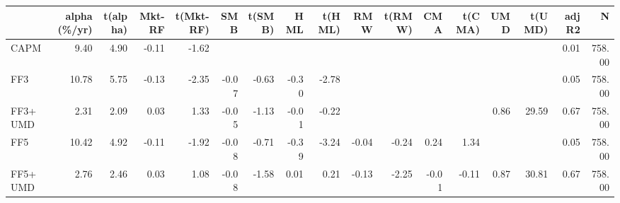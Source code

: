 \begin{tabular}{lrrrrrrrrrrrrrrrr}
\toprule
 & alpha (\%/yr) & t(alpha) & Mkt-RF & t(Mkt-RF) & SMB & t(SMB) & HML & t(HML) & RMW & t(RMW) & CMA & t(CMA) & UMD & t(UMD) & adj R2 & N \\
\midrule
CAPM & 9.40 & 4.90 & -0.11 & -1.62 &  &  &  &  &  &  &  &  &  &  & 0.01 & 758.00 \\
FF3 & 10.78 & 5.75 & -0.13 & -2.35 & -0.07 & -0.63 & -0.30 & -2.78 &  &  &  &  &  &  & 0.05 & 758.00 \\
FF3+UMD & 2.31 & 2.09 & 0.03 & 1.33 & -0.05 & -1.13 & -0.01 & -0.22 &  &  &  &  & 0.86 & 29.59 & 0.67 & 758.00 \\
FF5 & 10.42 & 4.92 & -0.11 & -1.92 & -0.08 & -0.71 & -0.39 & -3.24 & -0.04 & -0.24 & 0.24 & 1.34 &  &  & 0.05 & 758.00 \\
FF5+UMD & 2.76 & 2.46 & 0.03 & 1.08 & -0.08 & -1.58 & 0.01 & 0.21 & -0.13 & -2.25 & -0.01 & -0.11 & 0.87 & 30.81 & 0.67 & 758.00 \\
\bottomrule
\end{tabular}
